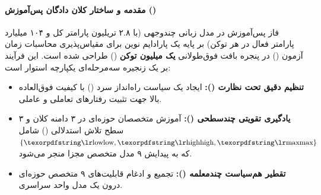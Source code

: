 \item {}

\paragraph*{مقدمه و ساختار کلان دادگان پس‌آموزش ()}
فاز پس‌آموزش در مدل زبانی چندوجهی  \cite{kimi2026k3} (با ۲.۸ تریلیون پارامتر کل و ۱۰۴ میلیارد پارامتر فعال در هر توکن) بر پایه یک پارادایم نوین برای مقیاس‌پذیری محاسبات زمان آزمون () در پنجره بافت فوق‌طولانی \textbf{یک میلیون توکن} () طراحی شده است. این فرآیند بر یک زنجیره سه‌مرحله‌ای یکپارچه استوار است:
\begin{itemize}
    \item \textbf{تنظیم دقیق تحت نظارت ():} ایجاد یک سیاست راه‌انداز سرد () با کیفیت فوق‌العاده بالا جهت تثبیت رفتارهای تعاملی و عاملی.
    \item \textbf{یادگیری تقویتی چندسطحی ():} آموزش متخصصان حوزه‌ای در ۳ دامنه کلان و ۳ سطح تلاش استدلالی () شامل $\{\text{\en{low}}, \text{\en{high}}, \text{\en{max}}\}$ که به پیدایش ۹ مدل متخصص مجزا منجر می‌شود.
    \item \textbf{تقطیر هم‌سیاست چندمعلمه ():} تجمیع و ادغام قابلیت‌های ۹ متخصص حوزه‌ای درون یک مدل واحد سراسری.
\end{itemize}

